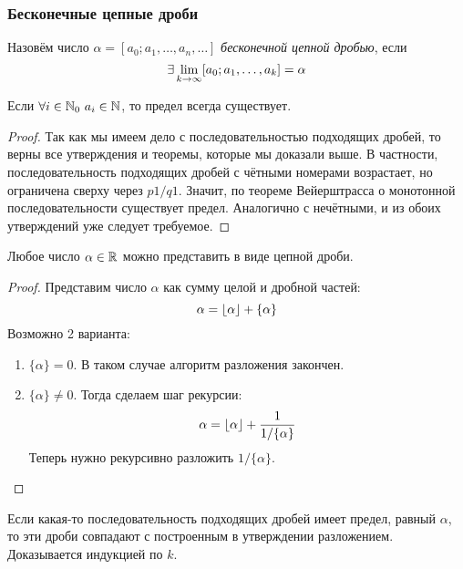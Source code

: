\subsubsection*{Бесконечные цепные дроби}

\begin{definition}
	Назовём число $\alpha = [a_0; a_1, \ldots, a_n, \ldots]$ \textit{бесконечной цепной дробью}, если
	\[
		\exists \lim\limits_{k \to \infty} [a_0; a_1, \ldots, a_k] = \alpha
	\]
\end{definition}

\begin{theorem}
	Если $\forall i \in \mathbb{N}_0\ a_i \in \mathbb{N}$, то предел всегда существует.
\end{theorem}

\begin{proof}
	Так как мы имеем дело с последовательностью подходящих дробей, то верны все утверждения и теоремы, которые мы доказали выше. В частности, последовательность подходящих дробей с чётными номерами возрастает, но ограничена сверху через $p1/q1$. Значит, по теореме Вейерштрасса о монотонной последовательности существует предел. Аналогично с нечётными, и из обоих утверждений уже следует требуемое.
\end{proof}

\begin{proposition}
	Любое число $\alpha \in \mathbb{R}$ можно представить в виде цепной дроби.
\end{proposition}

\begin{proof}
	Представим число $\alpha$ как сумму целой и дробной частей:
	\[
		\alpha = \left\lfloor \alpha \right\rfloor + \{\alpha\}
	\]
	Возможно 2 варианта:
	\begin{enumerate}
		\item $\{\alpha\} = 0$. В таком случае алгоритм разложения закончен.
		
		\item $\{\alpha\} \neq 0$. Тогда сделаем шаг рекурсии:
		\[
			\alpha = \left\lfloor \alpha \right\rfloor + \frac{1}{1 / \{\alpha\}}
		\]
		Теперь нужно рекурсивно разложить $1 / \{\alpha\}$.
	\end{enumerate}
\end{proof}

\begin{note}
	Если какая-то последовательность подходящих дробей имеет предел, равный $\alpha$, то эти дроби совпадают с построенным в утверждении разложением. Доказывается индукцией по $k$.
\end{note}

